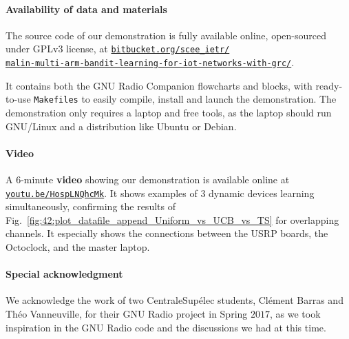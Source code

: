\paragraph{Availability of data and materials}

The source code of our demonstration is fully available online, open-sourced under GPLv3 license, at
\href{https://bitbucket.org/scee_ietr/malin-multi-arm-bandit-learning-for-iot-networks-with-grc}{\texttt{bitbucket.org/scee\_ietr/\\malin-multi-arm-bandit-learning-for-iot-networks-with-grc/}}.

It contains both the GNU Radio Companion flowcharts and blocks, with ready-to-use \texttt{Makefiles} to easily compile, install and launch the demonstration.
The demonstration only requires a laptop and free tools,
as the laptop should run GNU/Linux and a distribution like Ubuntu or Debian.

\paragraph{Video}

A $6$-minute \textbf{video} showing our demonstration is available online at \texttt{\url{youtu.be/HospLNQhcMk}}.
It shows examples of $3$ dynamic devices learning simultaneously, confirming the results of Fig.~\ref{fig:42:plot_datafile_append_Uniform_vs_UCB_vs_TS} for overlapping channels.
It especially shows the connections between the USRP boards, the Octoclock, and the master laptop.

\paragraph{Special acknowledgment}

We acknowledge the work of two CentraleSup{\'e}lec students,
Cl{\'e}ment Barras and Th{\'e}o Vanneuville, for their GNU Radio project in Spring $2017$,
as we took inspiration in the GNU Radio code and the discussions we had at this time.

